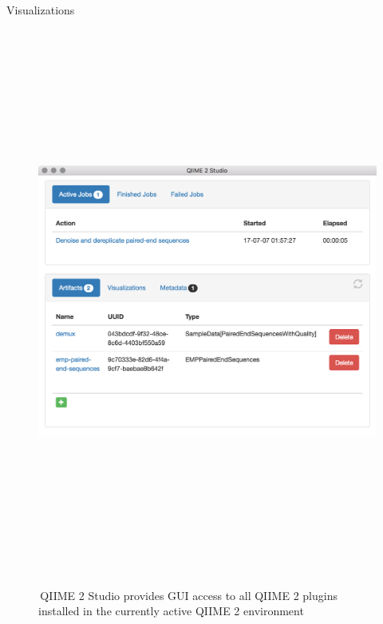 \documentclass[final]{beamer}
\newlength{\colwidth}
\begin{document}
\begin{frame}[t]
\begin{columns}[t]
\begin{column}{\colwidth}
\begin{block}{Visualizations}
    \begin{figure}[tph!]
      {\includegraphics[height=18cm]{assets/q2studio}}
      \caption{\,QIIME 2 Studio provides GUI access to all QIIME 2 plugins installed in the currently active QIIME 2 environment}
      \label{fig:q2studio}
    \end{figure}
  \end{block}


\end{column}
\end{columns}
\end{frame}
\end{document}
